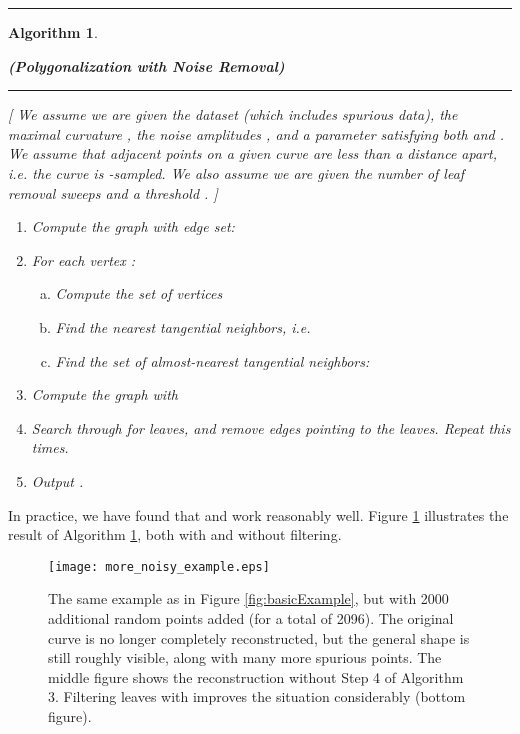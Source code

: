 \documentclass{article}
\newtheorem{algo}{Algorithm}
\numberwithin{cntr}{section}
\numberwithin{equation}{section}
\begin{document}
\hrule
\begin{algo}
  \label{algo:noisyPolygonalization}
  \begin{center}
  {\bf (Polygonalization with Noise Removal)}
  \end{center}

\vspace{.1in}

\hrule

\vspace{.2in}


[ We assume we are given the dataset  (which includes spurious data),
the maximal curvature
, the noise amplitudes , and a
parameter  satisfying both  and
.
We assume that adjacent points on a given curve
are less than a distance  apart, i.e. the curve is
-sampled. We also assume we are given the number of
leaf removal sweeps  and a
threshold . ]

\vspace{.1in}

  \begin{enumerate}
  \item Compute the graph  with edge set:
    
  \item For each vertex :
    \begin{enumerate}[a.]
    \item Compute the set of vertices
      
    \item Find the nearest tangential neighbors, i.e.
      
    \item Find the set of almost-nearest tangential neighbors:
      
    \end{enumerate}
  \item Compute the graph  with
    
  \item Search through  for leaves, and remove edges pointing to the leaves. Repeat this  times.
  \item Output .
  \end{enumerate}
\end{algo}

In practice, we have found that  and
 work reasonably well.
Figure \ref{fig:moreNoisyExample} illustrates the result of Algorithm
\ref{algo:noisyPolygonalization}, both with and without filtering.

\begin{figure}
\setlength{\unitlength}{0.240900pt}
\ifx\plotpoint\undefined\newsavebox{\plotpoint}\fi
\sbox{\plotpoint}{\rule[-0.200pt]{0.400pt}{0.400pt}}\texttt{[image: more\_noisy\_example.eps]}
\caption{The same example as in Figure \ref{fig:basicExample}, but with
2000 additional random points added (for a total of 2096).
The original curve is no longer completely reconstructed, but the
general shape is still roughly visible, along with many more spurious
points. The middle figure shows the reconstruction
without Step 4 of Algorithm 3. Filtering leaves with  improves
the situation considerably (bottom figure).
\label{fig:moreNoisyExample}}
\end{figure}
\end{document}
